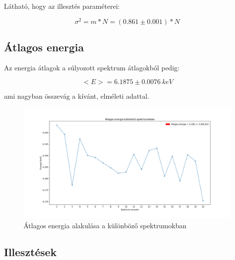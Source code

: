 \documentclass[12pt,a4paper]{article}
\theoremstyle{plain}
\begin{document}
\vspace{0.2cm}

\par Látható, hogy az illesztés paraméterei:

\vspace{0.2cm}

\begin{equation*}
	\sigma^{2} = m*N = (0.861 \pm 0.001)*N
\end{equation*}

\vspace{0.2cm}

\subsection{Átlagos energia}

\par Az energia átlagok a súlyozott spektrum átlagokból pedig:

\vspace{0.2cm}

\begin{equation*}
	\big<E\big> = 6.1875 \pm 0.0076 ~keV
\end{equation*}

\vspace{0.2cm}

\par ami nagyban összevág a kívánt, elméleti adattal.

\vspace{0.2cm}

\begin{figure}[H]
	\centering
	\includegraphics[width=0.8\linewidth ]{./atlagos-energia.png}
	\caption{Átlagos energia alakulása a különböző spektrumokban}
\end{figure}

\vspace{0.2cm}

\subsection{Illesztések}
\end{document}
